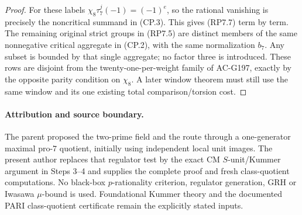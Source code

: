\begin{proof}
For these labels $\chi_8\tau_7^j(-1)=(-1)^e$, so the
rational vanishing is precisely the noncritical summand
in (CP.3). This gives (RP7.7) term by term. The remaining
original strict groups in (RP7.5) are distinct members of
the same nonnegative critical aggregate in (CP.2), with
the same normalization $b_7$. Any subset is bounded by that
single aggregate; no factor three is introduced.
These rows are disjoint from the twenty-one-per-weight family
of AC-G197, exactly by the opposite parity condition on
$\chi_8$. A later window theorem must still use the same
window and its one existing total comparison/torsion cost.
\end{proof}

\paragraph{Attribution and source boundary.}
The parent proposed the two-prime field and the route through
a one-generator maximal pro-$7$ quotient, initially using
independent local unit images. The present author replaces
that regulator test by the exact CM $S$-unit/Kummer argument
in Steps 3--4 and supplies the complete proof and fresh
class-quotient computations. No black-box $p$-rationality
criterion, regulator generation, GRH or Iwasawa $\mu$-bound
is used. Foundational Kummer theory and the documented PARI
class-quotient certificate remain the explicitly stated inputs.
